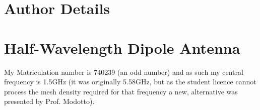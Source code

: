 \documentclass[colorlinks,11pt,a4paper,normalphoto,withhyper,ragged2e]{altareport}
\begin{document}
\MakeReportTitlePage


\setcounter{page}{1}






\section*{Author Details}
\makeauthordetails

\setcounter{tocdepth}{2} 
\tableofcontents %








\newpage

\section{Half-Wavelength Dipole Antenna}
My Matriculation number is 740239 (an odd number) and as such my central frequency is 1.5GHz (it was originally 5.58GHz, but as the student licence cannot process the mesh density required for that frequency a new, alternative was presented by Prof. Modotto).
\end{document}
